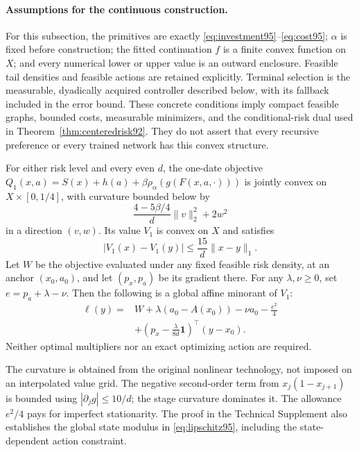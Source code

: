 \paragraph{Assumptions for the continuous construction.}
For this subsection, the primitives are exactly \eqref{eq:investment95}--\eqref{eq:cost95}; $\alpha$ is fixed before construction; the fitted continuation $f$ is a finite convex function on $X$; and every numerical lower or upper value is an outward enclosure. Feasible tail densities and feasible actions are retained explicitly. Terminal selection is the measurable, dyadically acquired controller described below, with its fallback included in the error bound. These concrete conditions imply compact feasible graphs, bounded costs, measurable minimizers, and the conditional-risk dual used in Theorem~\ref{thm:centeredrisk92}. They do not assert that every recursive preference or every trained network has this convex structure.

\begin{proposition}\label{prop:curvature95}
For either risk level and every even $d$, the one-date objective
$Q_1(x,a)=S(x)+h(a)+\beta\rho_\alpha(g(F(x,a,\cdot)))$
is jointly convex on $X\times[0,1/4]$, with curvature bounded below by
\begin{equation}\label{eq:curvature95}
 \frac{4-5\beta/4}{d}\|v\|_2^2+2w^2
\end{equation}
in a direction $(v,w)$. Its value $V_1$ is convex on $X$ and satisfies
\begin{equation}\label{eq:lipschitz95}
 |V_1(x)-V_1(y)|\leq\frac{15}{d}\|x-y\|_1.
\end{equation}
Let $W$ be the objective evaluated under any fixed feasible risk density, at an anchor $(x_0,a_0)$, and let $(p_x,p_a)$ be its gradient there. For any $\lambda,\nu\geq0$, set $e=p_a+\lambda-\nu$. Then the following is a global affine minorant of $V_1$:
\begin{align}\label{eq:affine95}
 \ell(y)={}&W+\lambda(a_0-A(x_0))-\nu a_0-\frac{e^2}{4}\nonumber\\
 &+\left(p_x-\frac{\lambda}{8d}\boldsymbol{1}\right)^{\!\top}(y-x_0).
\end{align}
Neither optimal multipliers nor an exact optimizing action are required.
\end{proposition}

The curvature is obtained from the original nonlinear technology, not imposed on an interpolated value grid. The negative second-order term from $x_j(1-x_{j+1})$ is bounded using $|\partial_jg|\leq10/d$; the stage curvature dominates it. The allowance $e^2/4$ pays for imperfect stationarity. The proof in the Technical Supplement also establishes the global state modulus in \eqref{eq:lipschitz95}, including the state-dependent action constraint.


